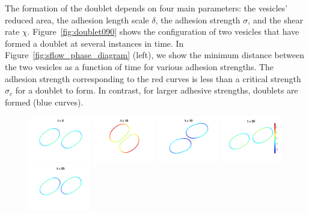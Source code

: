 \documentclass[%
preprint,
 amsmath,amssymb,
 aps,
]{revtex4-1}
\begin{document}
The formation of the doublet depends on four main parameters: the
vesicles' reduced area, the adhesion length scale $\delta$, the adhesion
strength $\sigma$, and the shear rate $\chi$.
Figure~\ref{fig:doublet090} shows the configuration of two vesicles that
have formed a doublet at several instances in time.  In
Figure~\ref{fig:sflow_phase_diagram} (left), we show the minimum
distance between the two vesicles as a function of time for various
adhesion strengths.  The adhesion strength corresponding to the red
curves is less than a critical strength $\sigma_c$ for a doublet to
form.  In contrast, for larger adhesive strengths, doublets are formed
(blue curves).

\begin{figure}[htp]
  \includegraphics[width=0.24\textwidth]{figs/adR4em1adS7em1Chi5em1_ra090_image01.png}
  \includegraphics[width=0.24\textwidth]{figs/adR4em1adS7em1Chi5em1_ra090_image02.png}
  \includegraphics[width=0.24\textwidth]{figs/adR4em1adS7em1Chi5em1_ra090_image03.png}
  \includegraphics[width=0.24\textwidth]{figs/adR4em1adS7em1Chi5em1_ra090_image04.png}
  \includegraphics[width=0.24\textwidth]{figs/adR4em1adS7em1Chi5em1_ra090_image05.png}

\end{figure}
\end{document}
